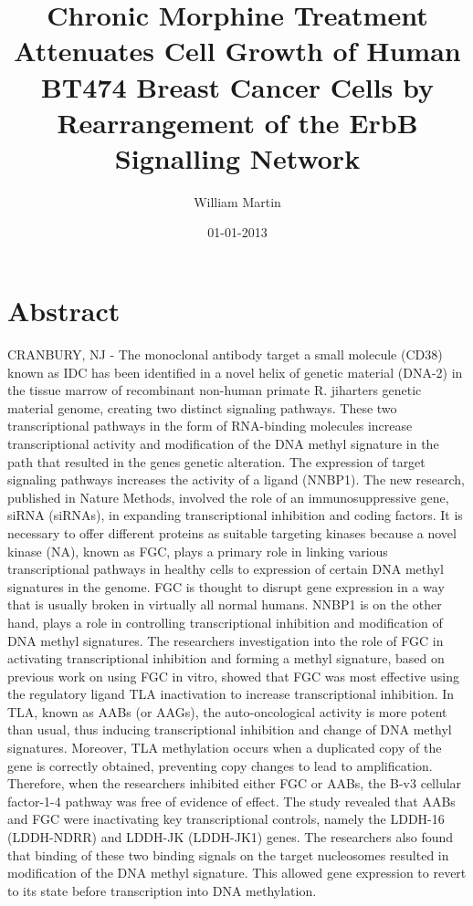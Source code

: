 \documentclass{article}%
\title{Chronic Morphine Treatment Attenuates Cell Growth of Human BT474 Breast Cancer Cells by Rearrangement of the ErbB Signalling Network}%
\author{William Martin}%
\affil{Institute of Orthopedic Surgery, Xijing Hospital, Fourth Military Medical University, Xian, Peoples Republic of China}%
\date{01{-}01{-}2013}%
\begin{document}
%
\normalsize%
\maketitle%
\section{Abstract}%
\label{sec:Abstract}%
CRANBURY, NJ {-}  The monoclonal antibody target a small molecule (CD38) known as IDC has been identified in a novel helix of genetic material (DNA{-}2) in the tissue marrow of recombinant non{-}human primate R. jiharters genetic material genome, creating two distinct signaling pathways. These two transcriptional pathways in the form of RNA{-}binding molecules increase transcriptional activity and modification of the DNA methyl signature in the path that resulted in the genes genetic alteration. The expression of target signaling pathways increases the activity of a ligand (NNBP1).\newline%
The new research, published in Nature Methods, involved the role of an immunosuppressive gene, siRNA (siRNAs), in expanding transcriptional inhibition and coding factors. It is necessary to offer different proteins as suitable targeting kinases because a novel kinase (NA), known as FGC, plays a primary role in linking various transcriptional pathways in healthy cells to expression of certain DNA methyl signatures in the genome. FGC is thought to disrupt gene expression in a way that is usually broken in virtually all normal humans. NNBP1 is on the other hand, plays a role in controlling transcriptional inhibition and modification of DNA methyl signatures.\newline%
The researchers investigation into the role of FGC in activating transcriptional inhibition and forming a methyl signature, based on previous work on using FGC in vitro, showed that FGC was most effective using the regulatory ligand TLA inactivation to increase transcriptional inhibition. In TLA, known as AABs (or AAGs), the auto{-}oncological activity is more potent than usual, thus inducing transcriptional inhibition and change of DNA methyl signatures. Moreover, TLA methylation occurs when a duplicated copy of the gene is correctly obtained, preventing copy changes to lead to amplification.\newline%
Therefore, when the researchers inhibited either FGC or AABs, the B{-}v3 cellular factor{-}1{-}4 pathway was free of evidence of effect.\newline%
The study revealed that AABs and FGC were inactivating key transcriptional controls, namely the LDDH{-}16 (LDDH{-}NDRR) and LDDH{-}JK (LDDH{-}JK1) genes. The researchers also found that binding of these two binding signals on the target nucleosomes resulted in modification of the DNA methyl signature. This allowed gene expression to revert to its state before transcription into DNA methylation.\newline%
\end{document}
